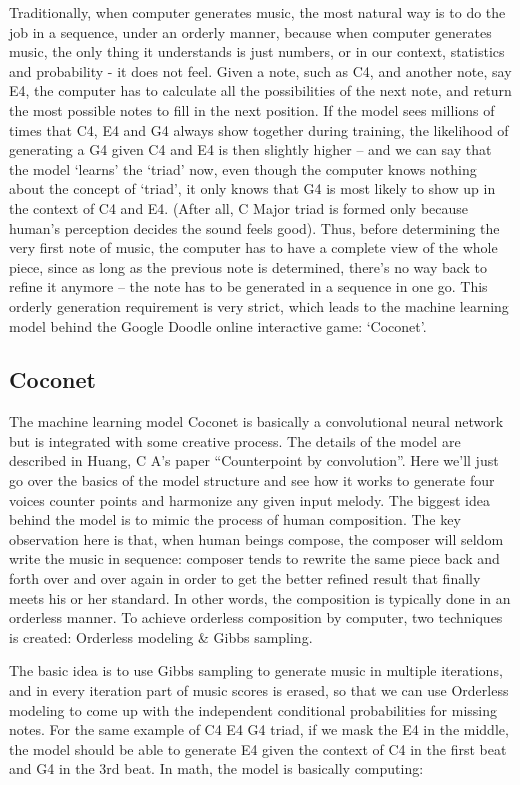 \documentclass[jou]{apa6}
\begin{document}
Traditionally, when computer generates music, the most natural way is to do the job in a sequence, under an orderly manner, because when computer generates music, the only thing it understands is just numbers, or in our context,  statistics and probability - it does not feel. Given a note, such as C4, and another note, say E4, the computer has to calculate all the possibilities of the next note, and return the most possible notes to fill in the next position. If  the model sees millions of times that C4, E4 and G4 always show together during training, the likelihood of generating a G4 given C4 and E4 is then slightly higher -- and we can say that the model ‘learns’ the ‘triad’ now, even though the computer knows nothing about the concept of ‘triad’, it only knows that G4 is most likely to show up in the context of C4 and E4. (After all, C Major triad is formed only because human’s perception decides the sound feels good). Thus, before determining the very first note of  music, the computer has to have a complete view of  the whole piece, since as long as the previous note is determined, there’s no way back to refine it anymore -- the note has to be generated in a sequence in one go. This orderly generation requirement is very strict,  which leads to the machine learning model behind the Google Doodle online interactive game: ‘Coconet’.

\subsection{Coconet}

The machine learning model Coconet is basically a convolutional neural network but is integrated with some creative process. The details of the model are described in Huang, C A’s paper “Counterpoint by convolution”. Here we’ll just go over the basics of the model structure and see how it works to generate four voices counter points and harmonize any given input melody.
The biggest idea behind the model is to mimic the process of human composition. The key observation here is that, when human beings compose, the composer will seldom write the music in sequence: composer tends to rewrite the same piece back and forth over and over again in order to get the better refined result that finally meets his or her standard. In other words, the composition is typically done in an orderless manner. To achieve orderless composition by computer, two techniques is created: Orderless modeling & Gibbs sampling.

The basic idea is to use Gibbs sampling to generate music in multiple iterations, and in every iteration part of music scores is erased, so that we can use Orderless modeling to come up with the independent conditional probabilities for missing notes. For the same example of C4 E4 G4 triad,  if we mask the E4 in the middle, the model should be able to generate E4 given the context of  C4 in the first beat and G4 in the 3rd beat. In math, the model is basically computing: 
\end{document}
